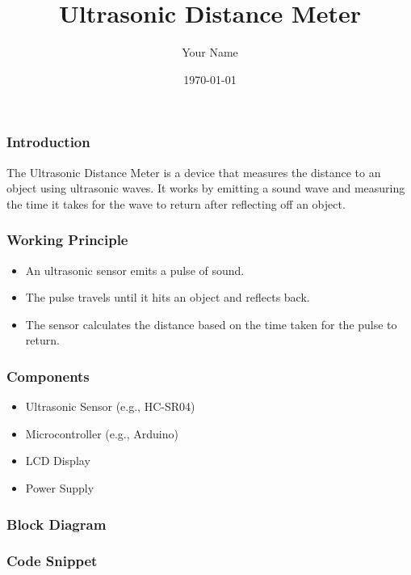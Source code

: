 \documentclass{beamer}
\title{Ultrasonic Distance Meter}
\author{Your Name}
\date{\today}
\begin{document}
\frame{\titlepage}

\begin{frame}
    \frametitle{Introduction}
    The Ultrasonic Distance Meter is a device that measures the distance to an object using ultrasonic waves. It works by emitting a sound wave and measuring the time it takes for the wave to return after reflecting off an object.
\end{frame}

\begin{frame}
    \frametitle{Working Principle}
    \begin{itemize}
        \item An ultrasonic sensor emits a pulse of sound.
        \item The pulse travels until it hits an object and reflects back.
        \item The sensor calculates the distance based on the time taken for the pulse to return.
    \end{itemize}
\end{frame}

\begin{frame}
    \frametitle{Components}
    \begin{itemize}
        \item Ultrasonic Sensor (e.g., HC-SR04)
        \item Microcontroller (e.g., Arduino)
        \item LCD Display
        \item Power Supply
    \end{itemize}
\end{frame}

\begin{frame}
    \frametitle{Block Diagram}
\end{frame}

\begin{frame}
    \frametitle{Code Snippet}


\end{frame}
\end{document}
